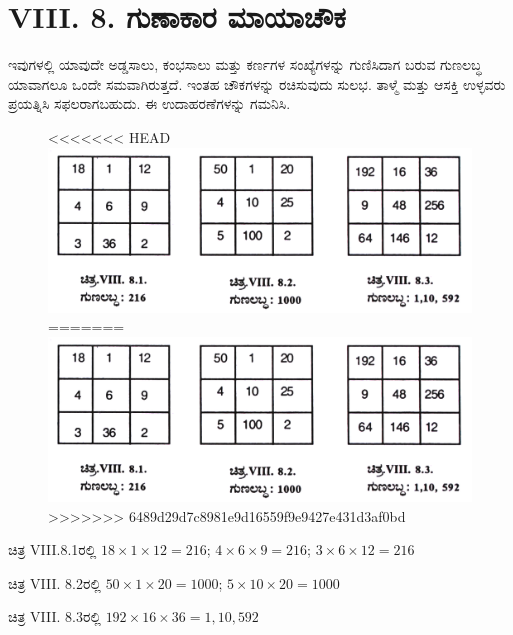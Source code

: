 \section*{VIII. 8. ಗುಣಾಕಾರ ಮಾಯಾಚೌಕ}

ಇವುಗಳಲ್ಲಿ ಯಾವುದೇ ಅಡ್ಡಸಾಲು, ಕಂಭಸಾಲು ಮತ್ತು ಕರ್ಣಗಳ ಸಂಖ್ಯೆಗಳನ್ನು ಗುಣಿಸಿದಾಗ ಬರುವ ಗುಣಲಬ್ಧ ಯಾವಾಗಲೂ ಒಂದೇ ಸಮವಾಗಿರುತ್ತದೆ. ಇಂತಹ ಚೌಕಗಳನ್ನು ರಚಿಸುವುದು ಸುಲಭ. ತಾಳ್ಮೆ ಮತ್ತು ಆಸಕ್ತಿ ಉಳ್ಳವರು ಪ್ರಯತ್ನಿಸಿ ಸಫಲರಾಗಬಹುದು. ಈ ಉದಾಹರಣೆಗಳನ್ನು ಗಮನಿಸಿ.
\begin{figure}[H]
<<<<<<< HEAD
\includegraphics{src/figures/chap7/fig7-26.jpg}
=======
\includegraphics[scale=0.8]{src/figures/chap7/fig7.26.jpg}
>>>>>>> 6489d29d7c8981e9d16559f9e9427e431d3af0bd
\end{figure}

ಚಿತ್ರ VIII.8.1ರಲ್ಲಿ $18 \times 1 \times12=216$; $4 \times 6 \times 9=216$; $3 \times 6\times 12=216$

ಚಿತ್ರ VIII. 8.2ರಲ್ಲಿ $50 \times 1 \times 20=1000$; $5 \times 10\times  20=1000$

ಚಿತ್ರ VIII. 8.3ರಲ್ಲಿ $192 \times 16\times 36=1,10,592$

